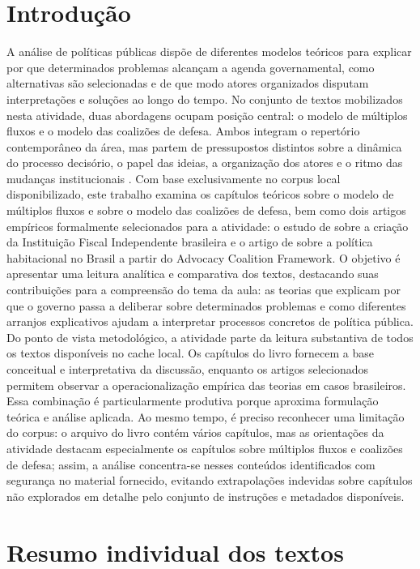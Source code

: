 \documentclass[12pt,a4paper]{article}
\begin{document}
\section{Introdução}
\label{sec:org79ef39d}
A análise de políticas públicas dispõe de diferentes modelos teóricos para explicar por que determinados problemas alcançam a agenda governamental, como alternativas são selecionadas e de que modo atores organizados disputam interpretações e soluções ao longo do tempo. No conjunto de textos mobilizados nesta atividade, duas abordagens ocupam posição central: o modelo de múltiplos fluxos e o modelo das coalizões de defesa. Ambos integram o repertório contemporâneo da área, mas partem de pressupostos distintos sobre a dinâmica do processo decisório, o papel das ideias, a organização dos atores e o ritmo das mudanças institucionais \autocites{capella2022multiplos}{araujoSilva2022coalizoes}.
Com base exclusivamente no corpus local disponibilizado, este trabalho examina os capítulos teóricos sobre o modelo de múltiplos fluxos e sobre o modelo das coalizões de defesa, bem como dois artigos empíricos formalmente selecionados para a atividade: o estudo de \textcite{bijos2024ifi} sobre a criação da Instituição Fiscal Independente brasileira e o artigo de \textcite{ferreira2019habitacional} sobre a política habitacional no Brasil a partir do Advocacy Coalition Framework. O objetivo é apresentar uma leitura analítica e comparativa dos textos, destacando suas contribuições para a compreensão do tema da aula: as teorias que explicam por que o governo passa a deliberar sobre determinados problemas e como diferentes arranjos explicativos ajudam a interpretar processos concretos de política pública.
Do ponto de vista metodológico, a atividade parte da leitura substantiva de todos os textos disponíveis no cache local. Os capítulos do livro fornecem a base conceitual e interpretativa da discussão, enquanto os artigos selecionados permitem observar a operacionalização empírica das teorias em casos brasileiros. Essa combinação é particularmente produtiva porque aproxima formulação teórica e análise aplicada. Ao mesmo tempo, é preciso reconhecer uma limitação do corpus: o arquivo do livro contém vários capítulos, mas as orientações da atividade destacam especialmente os capítulos sobre múltiplos fluxos e coalizões de defesa; assim, a análise concentra-se nesses conteúdos identificados com segurança no material fornecido, evitando extrapolações indevidas sobre capítulos não explorados em detalhe pelo conjunto de instruções e metadados disponíveis.
\section{Resumo individual dos textos}
\label{sec:org93756f6}
\end{document}
